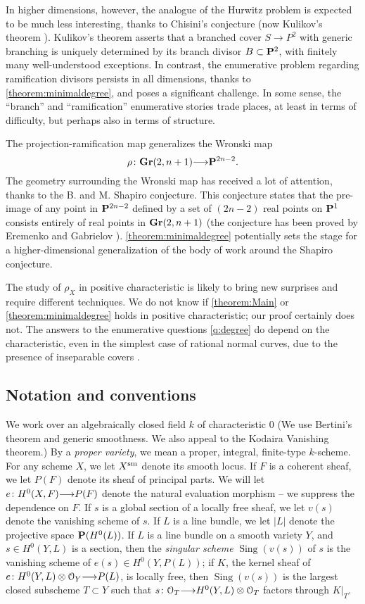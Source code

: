 \documentclass[11pt,reqno]{amsart}
\theoremstyle{plain}
\theoremstyle{definition}
\theoremstyle{remark}
\numberwithin{equation}{section}
\DeclareMathOperator{\sing}{Sing}
\newcommand{\cO}{{\mathcal O}}
\renewcommand{\to}{{\longrightarrow}}
\numberwithin{equation}{section}
\begin{document}
In higher dimensions, however, the analogue of the Hurwitz problem is expected to be much less interesting, thanks to Chisini's conjecture (now Kulikov's theorem \cite{1064-5632-63-6-A03}).
Kulikov's theorem asserts that a branched cover $S \to P^2$ with generic branching is uniquely determined by its branch divisor $B \subset \P^{2}$, with finitely many well-understood exceptions.
In contrast, the enumerative problem regarding ramification divisors persists in all dimensions, thanks to \autoref{theorem:minimaldegree}, and poses a significant challenge.
In some sense, the ``branch'' and ``ramification'' enumerative stories trade places, at least in terms of difficulty, but perhaps also in terms of structure.

The projection-ramification map generalizes the Wronski map
\[ \rho \from \Gr(2, n+1) \to \P^{2n-2}.\]
The geometry surrounding the Wronski map has received a lot of attention, thanks to the B. and M. Shapiro conjecture.
This conjecture states that the pre-image of any point in $\P^{2n-2}$ defined by a set of $(2n-2)$ real points on $\P^1$ consists entirely of real points in $\Gr(2, n+1)$ \cite{sottile2000} (the conjecture has been proved by Eremenko and Gabrielov \cite{Erem/Gabr1}).
\autoref{theorem:minimaldegree} potentially sets the stage for a higher-dimensional generalization of the body of work around the Shapiro conjecture.

The study of $\rho_X$ in positive characteristic is likely to bring new surprises and require different techniques.
We do not know if \autoref{theorem:Main} or \autoref{theorem:minimaldegree} holds in positive characteristic; our proof certainly does not.
The answers to the enumerative questions \autoref{q:degree} do depend on the characteristic, even in the simplest case of rational normal curves, due to the presence of inseparable covers \cite{MR2218904}.

\subsection{Notation and conventions} We work over an algebraically closed field
$k$ of characteristic $0$ (We use Bertini's theorem and generic smoothness. We
also appeal to the Kodaira Vanishing theorem.) By a {\sl proper variety}, we mean a proper, integral, finite-type $k$-scheme. For any scheme $X$, we let $X^{\rm sm}$ denote its smooth locus. If $F$ is a coherent sheaf, we let $P(F)$ denote its sheaf of principal parts. We will let $e\from H^{0}(X,F) \to P(F)$ denote the natural evaluation morphism -- we suppress the dependence on $F$. If $s$ is a global section of a locally free sheaf, we let $v(s)$ denote the vanishing scheme of $s$.  If $L$ is a line bundle, we let $|L|$ denote the projective space $\P(H^{0}(L))$.  If $L$ is a line bundle on a smooth variety $Y$, and $s \in H^{0}(Y,L)$ is a section, then the {\sl singular scheme} $\sing(v(s))$ of $s$ is the vanishing scheme of $e(s) \in H^{0}(Y,P(L))$; if $K$, the kernel sheaf of $e \from H^{0}(Y,L) \otimes \cO_{Y} \to P(L)$, is locally free, then $\sing(v(s))$ is the largest closed subscheme $T \subset Y$  such that $s\from \cO_{T} \to H^{0}(Y,L) \otimes \cO_{T}$ factors through $K|_{T}$.  
\end{document}
